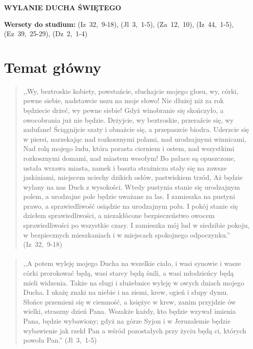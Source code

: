 \documentclass[10pt,a4paper,oneside]{article}
\begin{document}
\centerline{\textbf{\MakeUppercase{Wylanie Ducha Świętego}}}
\begin{center}
\textbf{Wersety do studium:} 
\mbox{(Iz 32, 9-18)}, \mbox{(Jl 3, 1-5)}, \mbox{(Za 12, 10)}, \mbox{(Iz 44, 1-5)}, \mbox{(Ez 39, 25-29)}, \mbox{(Dz 2, 1-4)}
\end{center}
\section{Temat główny}
\paragraph{}
\begin{quote}
,,Wy, beztroskie kobiety, powstańcie, słuchajcie mojego głosu, wy, córki, pewne siebie, nadstawcie uszu na moje słowo! Nie dłużej niż za rok będziecie drżeć, wy pewne siebie! Gdyż winobranie się skończyło, a owocobrania już nie będzie. Drżyjcie, wy beztroskie, przeraźcie się, wy zadufane! Ściągnijcie szaty i obnażcie się, a przepaszcie biodra. Uderzcie się w piersi, narzekając nad rozkosznymi polami, nad urodzajnymi winnicami, Nad rolą mojego ludu, która porasta cierniem i ostem, nad wszystkimi rozkosznymi domami, nad miastem wesołym! Bo pałace są opuszczone, ustała wrzawa miasta, zamek i baszta strażnicza stały się na zawsze jaskiniami, miejscem uciechy dzikich osłów, pastwiskiem trzód, Aż będzie wylany na nas Duch z wysokości. Wtedy pustynia stanie się urodzajnym polem, a urodzajne pole będzie uważane za las. I zamieszka na pustyni prawo, a sprawiedliwość osiądzie na urodzajnym polu. I pokój stanie się dziełem sprawiedliwości, a niezakłócone bezpieczeństwo owocem sprawiedliwości po wszystkie czasy. I zamieszka mój lud w siedzibie pokoju, w bezpiecznych mieszkaniach i w miejscach spokojnego odpoczynku.'' \mbox{(Iz 32, 9-18)}
\end{quote}
\paragraph{}
\begin{quote}
,,A potem wyleję mojego Ducha na wszelkie ciało, i wasi synowie i wasze córki prorokować będą, wasi starcy będą śnili, a wasi młodzieńcy będą mieli widzenia. Także na sługi i służebnice wyleję w owych dniach mojego Ducha. I ukażę znaki na niebie i na ziemi, krew, ogień i słupy dymu. Słońce przemieni się w ciemność, a księżyc w krew, zanim przyjdzie ów wielki, straszny dzień Pana. Wszakże każdy, kto będzie wzywał imienia Pana, będzie wybawiony; gdyż na górze Syjon i w Jeruzalemie będzie wybawienie jak rzekł Pan a wśród pozostałych przy życiu będą ci, których powoła Pan.'' \mbox{(Jl 3, 1-5)}
\end{quote}
\end{document}
